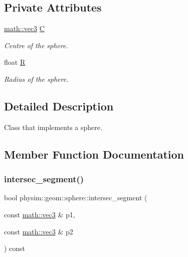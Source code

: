 \subsection*{Private Attributes}
\begin{DoxyCompactItemize}
\item 
\mbox{\label{classphysim_1_1geom_1_1sphere_a4fa60a309b66cd257ab390b4ad0374b1}} 
\hyperlink{structphysim_1_1math_1_1vec3}{math\+::vec3} \hyperlink{classphysim_1_1geom_1_1sphere_a4fa60a309b66cd257ab390b4ad0374b1}{C}
\begin{DoxyCompactList}\small\item\em Centre of the sphere. \end{DoxyCompactList}\item 
\mbox{\label{classphysim_1_1geom_1_1sphere_ad54eb933033f8c8a77cfa59b49360114}} 
float \hyperlink{classphysim_1_1geom_1_1sphere_ad54eb933033f8c8a77cfa59b49360114}{R}
\begin{DoxyCompactList}\small\item\em Radius of the sphere. \end{DoxyCompactList}\end{DoxyCompactItemize}


\subsection{Detailed Description}
Class that implements a sphere. 

\subsection{Member Function Documentation}
\mbox{\label{classphysim_1_1geom_1_1sphere_adb110ef393addb0ea8eb980d223f76ed}} 
\subsubsection{\texorpdfstring{intersec\+\_\+segment()}{intersec\_segment()}\hspace{0.1cm}{\footnotesize\ttfamily [1/2]}}
{\footnotesize\ttfamily bool physim\+::geom\+::sphere\+::intersec\+\_\+segment (\begin{DoxyParamCaption}\item[{const \hyperlink{structphysim_1_1math_1_1vec3}{math\+::vec3} \&}]{p1,  }\item[{const \hyperlink{structphysim_1_1math_1_1vec3}{math\+::vec3} \&}]{p2 }\end{DoxyParamCaption}) const\hspace{0.3cm}{\ttfamily [virtual]}}



